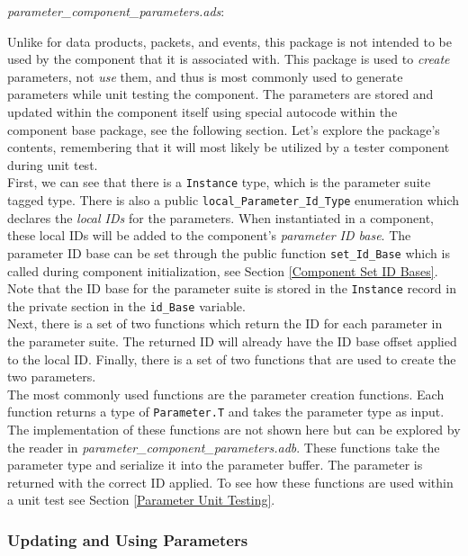 \textit{parameter\_component\_parameters.ads}:

Unlike for data products, packets, and events, this package is not intended to be used by the component that it is associated with. This package is used to \textit{create} parameters, not \textit{use} them, and thus is most commonly used to generate parameters while unit testing the component. The parameters are stored and updated within the component itself using special autocode within the component base package, see the following section. Let's explore the package's contents, remembering that it will most likely be utilized by a tester component during unit test. \\

First, we can see that there is a \texttt{Instance} type, which is the parameter suite tagged type. There is also a public \texttt{local\_Parameter\_Id\_Type} enumeration which declares the \textit{local IDs} for the parameters. When instantiated in a component, these local IDs will be added to the component's \textit{parameter ID base}. The parameter ID base can be set through the public function \texttt{set\_Id\_Base} which is called during component initialization, see Section \ref{Component Set ID Bases}. Note that the ID base for the parameter suite is stored in the \texttt{Instance} record in the private section in the \texttt{id\_Base} variable. \\

Next, there is a set of two functions which return the ID for each parameter in the parameter suite. The returned ID will already have the ID base offset applied to the local ID. Finally, there is a set of two functions that are used to create the two parameters. \\

The most commonly used functions are the parameter creation functions. Each function returns a type of \texttt{Parameter.T} and takes the parameter type as input. The implementation of these functions are not shown here but can be explored by the reader in \textit{parameter\_component\_parameters.adb}. These functions take the parameter type and serialize it into the parameter buffer. The parameter is returned with the correct ID applied. To see how these functions are used within a unit test see Section \ref{Parameter Unit Testing}.

\subsubsection{Updating and Using Parameters}

